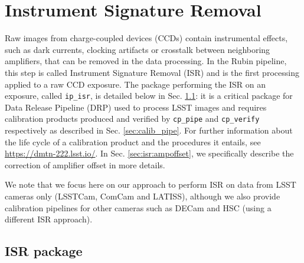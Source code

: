 \section{Instrument Signature Removal}
\label{sec:isr}

Raw images from charge-coupled devices (CCDs) contain instrumental effects, such as dark currents, clocking artifacts or crosstalk between neighboring amplifiers, that can be removed in the data processing.
In the Rubin pipeline, this step is called Instrument Signature Removal (ISR) and is the first processing applied to a raw CCD exposure.
The package performing the ISR on an exposure, called \texttt{ip\_isr}, is detailed below in Sec. \ref{sec:ip_isr}: it is a critical package for Data Release Pipeline (DRP) used to process LSST images and requires calibration products produced and verified by \texttt{cp\_pipe} and \texttt{cp\_verify} respectively as described in Sec. \ref{sec:calib_pipe}. For further information about the life cycle of a calibration product and the procedures it entails, see \url{https://dmtn-222.lsst.io/}. In Sec. \ref{sec:isr:ampoffset}, we specifically describe the correction of amplifier offset in more details.

We note that we focus here on our approach to perform ISR on data from LSST cameras only (LSSTCam, ComCam and LATISS), although we also provide calibration pipelines for other cameras such as DECam and HSC (using a different ISR approach).

\subsection{ISR package}
\label{sec:ip_isr}

